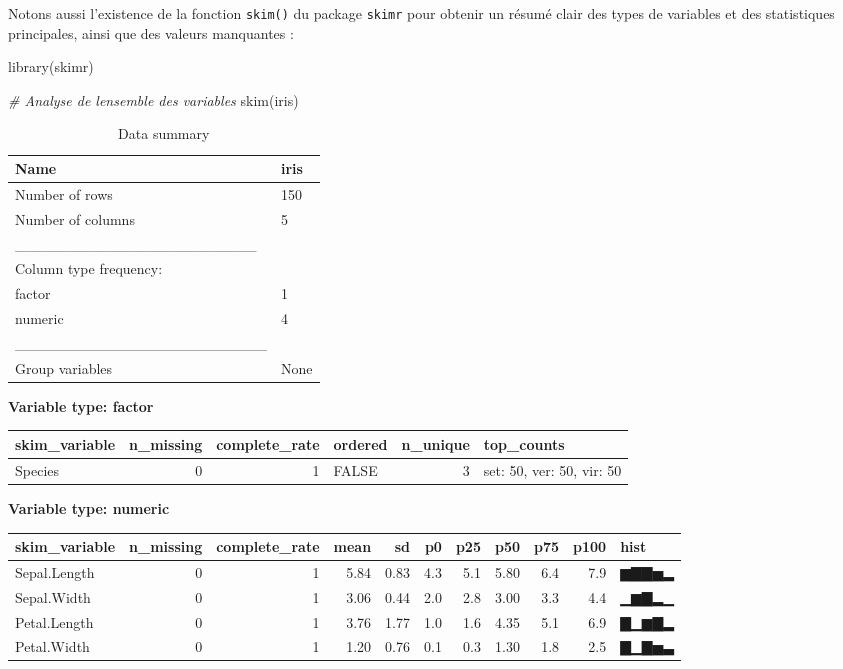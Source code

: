\documentclass[
]{book}
\newenvironment{Shaded}{\begin{snugshade}}{\end{snugshade}}
\newcommand{\CommentTok}[1]{\textcolor[rgb]{0.56,0.35,0.01}{\textit{#1}}}
\newcommand{\FunctionTok}[1]{\textcolor[rgb]{0.00,0.00,0.00}{#1}}
\newcommand{\NormalTok}[1]{#1}
\begin{document}
Notons aussi l'existence de la fonction \texttt{skim()} du package \texttt{skimr} pour obtenir un résumé clair des types de variables et des statistiques principales, ainsi que des valeurs manquantes :

\begin{Shaded}
\begin{Highlighting}[]
\FunctionTok{library}\NormalTok{(skimr)}

\CommentTok{\# Analyse de l\textquotesingle{}ensemble des variables}
\FunctionTok{skim}\NormalTok{(iris)}
\end{Highlighting}
\end{Shaded}

\begin{table}

\caption{\label{tab:unnamed-chunk-6}Data summary}
\centering
\begin{tabular}[t]{l|l}
\hline
Name & iris\\
\hline
Number of rows & 150\\
\hline
Number of columns & 5\\
\hline
\_\_\_\_\_\_\_\_\_\_\_\_\_\_\_\_\_\_\_\_\_\_\_ & \\
\hline
Column type frequency: & \\
\hline
factor & 1\\
\hline
numeric & 4\\
\hline
\_\_\_\_\_\_\_\_\_\_\_\_\_\_\_\_\_\_\_\_\_\_\_\_ & \\
\hline
Group variables & None\\
\hline
\end{tabular}
\end{table}

\textbf{Variable type: factor}

\begin{tabular}{l|r|r|l|r|l}
\hline
skim\_variable & n\_missing & complete\_rate & ordered & n\_unique & top\_counts\\
\hline
Species & 0 & 1 & FALSE & 3 & set: 50, ver: 50, vir: 50\\
\hline
\end{tabular}

\textbf{Variable type: numeric}

\begin{tabular}{l|r|r|r|r|r|r|r|r|r|l}
\hline
skim\_variable & n\_missing & complete\_rate & mean & sd & p0 & p25 & p50 & p75 & p100 & hist\\
\hline
Sepal.Length & 0 & 1 & 5.84 & 0.83 & 4.3 & 5.1 & 5.80 & 6.4 & 7.9 & ▆▇▇▅▂\\
\hline
Sepal.Width & 0 & 1 & 3.06 & 0.44 & 2.0 & 2.8 & 3.00 & 3.3 & 4.4 & ▁▆▇▂▁\\
\hline
Petal.Length & 0 & 1 & 3.76 & 1.77 & 1.0 & 1.6 & 4.35 & 5.1 & 6.9 & ▇▁▆▇▂\\
\hline
Petal.Width & 0 & 1 & 1.20 & 0.76 & 0.1 & 0.3 & 1.30 & 1.8 & 2.5 & ▇▁▇▅▃\\
\hline
\end{tabular}
\end{document}
